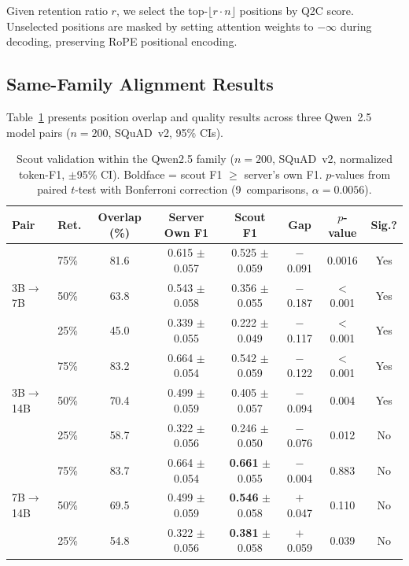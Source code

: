 \documentclass{article}
\newcommand{\QtoC}{\textsc{Q2C}\xspace}
\begin{document}
Given retention ratio $r$, we select the top-$\lfloor r \cdot n \rfloor$ positions by \QtoC score.
Unselected positions are masked by setting attention weights to $-\infty$ during decoding, preserving RoPE positional encoding.

\subsection{Same-Family Alignment Results}

Table~\ref{tab:scout_n200} presents position overlap and quality results across three Qwen~2.5 model pairs ($n = 200$, SQuAD~v2, 95\% CIs).

\begin{table}[t]
\centering
\caption{Scout validation within the Qwen2.5 family ($n = 200$, SQuAD~v2, normalized token-F1, $\pm$95\% CI). Boldface = scout F1 $\geq$ server's own F1. $p$-values from paired $t$-test with Bonferroni correction (9~comparisons, $\alpha = 0.0056$).}
\label{tab:scout_n200}
\small
\begin{tabular}{@{}llcccccc@{}}
\toprule
\textbf{Pair} & \textbf{Ret.} & \textbf{Overlap (\%)} & \textbf{Server Own F1} & \textbf{Scout F1} & \textbf{Gap} & \textbf{$p$-value} & \textbf{Sig.?} \\
\midrule
\multirow{3}{*}{3B$\to$7B}
  & 75\% & 81.6 & 0.615 $\pm$ 0.057 & 0.525 $\pm$ 0.059 & $-$0.091 & 0.0016 & Yes \\
  & 50\% & 63.8 & 0.543 $\pm$ 0.058 & 0.356 $\pm$ 0.055 & $-$0.187 & $<$0.001 & Yes \\
  & 25\% & 45.0 & 0.339 $\pm$ 0.055 & 0.222 $\pm$ 0.049 & $-$0.117 & $<$0.001 & Yes \\
\midrule
\multirow{3}{*}{3B$\to$14B}
  & 75\% & 83.2 & 0.664 $\pm$ 0.054 & 0.542 $\pm$ 0.059 & $-$0.122 & $<$0.001 & Yes \\
  & 50\% & 70.4 & 0.499 $\pm$ 0.059 & 0.405 $\pm$ 0.057 & $-$0.094 & 0.004 & Yes \\
  & 25\% & 58.7 & 0.322 $\pm$ 0.056 & 0.246 $\pm$ 0.050 & $-$0.076 & 0.012 & No \\
\midrule
\multirow{3}{*}{7B$\to$14B}
  & 75\% & 83.7 & 0.664 $\pm$ 0.054 & \textbf{0.661} $\pm$ 0.055 & $-$0.004 & 0.883 & No \\
  & 50\% & 69.5 & 0.499 $\pm$ 0.059 & \textbf{0.546} $\pm$ 0.058 & $+$0.047 & 0.110 & No \\
  & 25\% & 54.8 & 0.322 $\pm$ 0.056 & \textbf{0.381} $\pm$ 0.058 & $+$0.059 & 0.039 & No \\
\bottomrule
\end{tabular}
\end{table}
\end{document}
